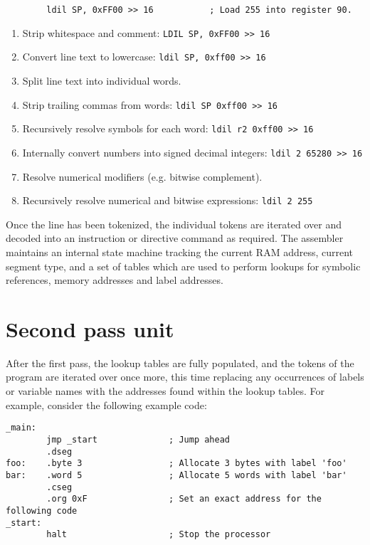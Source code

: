 \documentclass[12pt,twoside]{report}
\begin{document}
\begin{verbatim}
        ldil SP, 0xFF00 >> 16           ; Load 255 into register 90.
\end{verbatim}

\begin{enumerate}
\item Strip whitespace and comment: \texttt{LDIL SP, 0xFF00 >> 16}
\item Convert line text to lowercase: \texttt{ldil SP, 0xff00 >> 16}
\item Split line text into individual words.
\item Strip trailing commas from words: \texttt{ldil SP 0xff00 >> 16}
\item Recursively resolve symbols for each word: \texttt{ldil r2 0xff00 >> 16}
\item Internally convert numbers into signed decimal integers: \texttt{ldil 2 65280 >> 16}
\item Resolve numerical modifiers (e.g. bitwise complement).
\item Recursively resolve numerical and bitwise expressions: \texttt{ldil 2 255}
\end{enumerate}

Once the line has been tokenized, the individual tokens are iterated
over and decoded into an instruction or directive command as
required. The assembler maintains an internal state machine tracking
the current RAM address, current segment type, and a set of tables
which are used to perform lookups for symbolic references, memory
addresses and label addresses.

\section{Second pass unit}

After the first pass, the lookup tables are fully populated, and the
tokens of the program are iterated over once more, this time replacing
any occurrences of labels or variable names with the addresses found
within the lookup tables. For example, consider the following example
code:

\begin{verbatim}
_main:
        jmp _start              ; Jump ahead
        .dseg
foo:    .byte 3                 ; Allocate 3 bytes with label 'foo'
bar:    .word 5                 ; Allocate 5 words with label 'bar'
        .cseg
        .org 0xF                ; Set an exact address for the following code
_start:
        halt                    ; Stop the processor
\end{verbatim}
\end{document}
